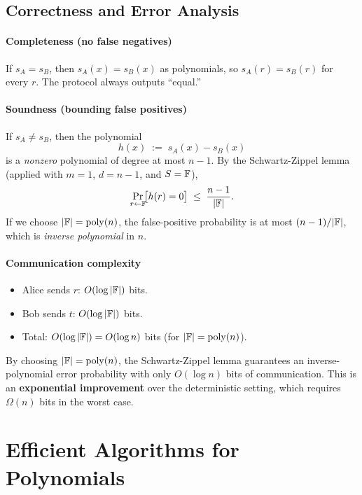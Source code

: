 \documentclass[11pt]{article}
\begin{document}
\subsection{Correctness and Error Analysis}

\paragraph{Completeness (no false negatives)}
If $s_A = s_B$, then $s_A(x) = s_B(x)$ as polynomials, so $s_A(r) = s_B(r)$
for every $r$. The protocol always outputs ``equal.''

\paragraph{Soundness (bounding false positives)}
If $s_A \neq s_B$, then the polynomial
\[
  h(x) \;:=\; s_A(x) - s_B(x)
\]
is a \emph{nonzero} polynomial of degree at most $n - 1$. By the
Schwartz-Zippel lemma (applied with $m = 1$, $d = n-1$, and $S = \mathbb{F}$),
\[
  \Pr_{r \leftarrow \mathbb{F}}\!\bigl[h(r) = 0\bigr] \;\leq\; \frac{n-1}{|\mathbb{F}|}.
\]
If we choose $|\mathbb{F}| = \mathrm{poly}(n)$, the false-positive probability is
at most $(n-1)/|\mathbb{F}|$, which is \emph{inverse polynomial} in $n$.

\paragraph{Communication complexity}
\begin{itemize}
  \item Alice sends $r$: $O(\log |\mathbb{F}|)$ bits.
  \item Bob sends $t$: $O(\log |\mathbb{F}|)$ bits.
  \item Total: $O(\log |\mathbb{F}|) = O(\log n)$ bits (for $|\mathbb{F}| = \mathrm{poly}(n)$).
\end{itemize}

\begin{tcolorbox}[colback=green!8!white, colframe=green!50!black,
                  title=Key Takeaway]
By choosing $|\mathbb{F}| = \mathrm{poly}(n)$, the Schwartz-Zippel lemma guarantees
an inverse-polynomial error probability with only $O(\log n)$ bits of
communication. This is an \textbf{exponential improvement} over the
deterministic setting, which requires $\Omega(n)$ bits in the worst case.
\end{tcolorbox}

\section{Efficient Algorithms for Polynomials}
\label{sec:poly-algorithms}
\end{document}
